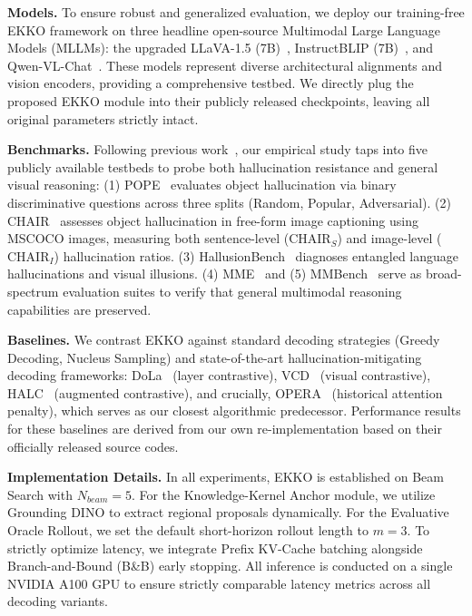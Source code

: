 \noindent\textbf{Models.} To ensure robust and generalized evaluation, we deploy our training-free EKKO framework on three headline open-source Multimodal Large Language Models (MLLMs): the upgraded LLaVA-1.5 (7B)~\cite{liu2023improvedllava}, InstructBLIP (7B)~\cite{instructblip}, and Qwen-VL-Chat~\cite{bai2023qwen}. These models represent diverse architectural alignments and vision encoders, providing a comprehensive testbed. We directly plug the proposed EKKO module into their publicly released checkpoints, leaving all original parameters strictly intact.

\noindent\textbf{Benchmarks.} Following previous work~\cite{huang2024opera_cvpr,leng2023mitigating}, our empirical study taps into five publicly available testbeds to probe both hallucination resistance and general visual reasoning:
(1) POPE~\cite{li2023pope} evaluates object hallucination via binary discriminative questions across three splits (Random, Popular, Adversarial).
(2) CHAIR~\cite{rohrbach2018object} assesses object hallucination in free-form image captioning using MSCOCO images, measuring both sentence-level ($\text{CHAIR}_S$) and image-level ($\text{CHAIR}_I$) hallucination ratios.
(3) HallusionBench~\cite{guan2024hallusionbench} diagnoses entangled language hallucinations and visual illusions.
(4) MME~\cite{fu2023mme} and (5) MMBench~\cite{liu2023mmbench} serve as broad-spectrum evaluation suites to verify that general multimodal reasoning capabilities are preserved.

\noindent\textbf{Baselines.} We contrast EKKO against standard decoding strategies (Greedy Decoding, Nucleus Sampling) and state-of-the-art hallucination-mitigating decoding frameworks: DoLa~\cite{chuang2023dola} (layer contrastive), VCD~\cite{leng2023mitigating} (visual contrastive), HALC~\cite{chen2024halc} (augmented contrastive), and crucially, OPERA~\cite{huang2024opera_cvpr} (historical attention penalty), which serves as our closest algorithmic predecessor. Performance results for these baselines are derived from our own re-implementation based on their officially released source codes.

\noindent\textbf{Implementation Details.} In all experiments, EKKO is established on Beam Search with $N_{beam}=5$. For the Knowledge-Kernel Anchor module, we utilize Grounding DINO to extract regional proposals dynamically. For the Evaluative Oracle Rollout, we set the default short-horizon rollout length to $m=3$. To strictly optimize latency, we integrate Prefix KV-Cache batching alongside Branch-and-Bound (B\&B) early stopping. All inference is conducted on a single NVIDIA A100 GPU to ensure strictly comparable latency metrics across all decoding variants.

